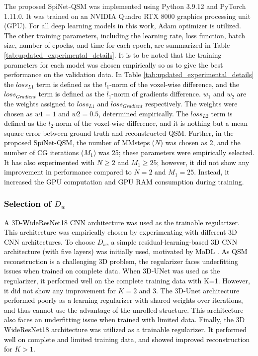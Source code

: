 \documentclass[sn-vancouver,Numbered]{sn-jnl}%
\begin{document}
The proposed SpiNet-QSM was implemented using Python 3.9.12 and PyTorch 1.11.0. It was trained on an NVIDIA Quadro RTX 8000 graphics processing unit (GPU). 
\noindent \textcolor{black} {For all deep learning models in this work, Adam optimizer is utilized. The other training parameters, including the learning rate, loss function, batch size, number of epochs, and time for each epoch, are summarized in Table \ref{tab:updated_experimental_details}. It is to be noted that the training parameters for each model was chosen empirically so as to give the best performance on the validation data. In Table \ref{tab:updated_experimental_details} the $loss_{L1}$ term is defined as the $l_1$-norm of the voxel-wise difference, and the $loss_{Gradient}$ term is defined as the $l_1$-norm of gradients difference. $w_1$ and $w_2$ are the weights assigned to $loss_{L1}$ and $loss_{Gradient}$ respectively. The weights were chosen as $w1=1$ and $w2=0.5$, determined empirically. The $loss_{L2}$ term is defined as the $l_2$-norm of the voxel-wise difference, and it is nothing but a mean square error between ground-truth and reconstructed QSM.} \textcolor{black}{Further, in the proposed SpiNet-QSM, the number of MMsteps ($N$) was chosen as 2, and the number of CG iterations ($M_1$) was 25; these parameters were empirically selected. It has also experimented with $N \ge 2$ and $M_{1} \ge 25$; however, it did not show any improvement in performance compared to $N=2$ and $M_{1}=25$. Instead, it increased the GPU computation and GPU RAM consumption during training. }


\vspace{8pt}
\textcolor{black}{\subsubsection{Selection of $D_w$}}

\noindent \textcolor{black}{A 3D-WideResNet18 CNN architecture was used as the trainable regularizer. This architecture was empirically chosen by experimenting with different 3D CNN architectures. To choose $D_w$, a simple residual-learning-based 3D CNN architecture (with five layers) was initially used, motivated by MoDL \cite{MoDL}. As QSM reconstruction is a challenging 3D problem, the regularizer faces underfitting issues when trained on complete data. When 3D-UNet was used as the regularizer, it performed well on the complete training data with K=1. However, it did not show any improvement for $K=2$ and 3. The 3D-Unet architecture performed poorly as a learning regularizer with shared weights over iterations, and thus cannot use the advantage of the unrolled structure. This architecture also faces an underfitting issue when trained with limited data. Finally, the 3D WideResNet18 architecture was utilized as a trainable regularizer. It performed well on complete and limited training data, and showed improved reconstruction for $K>1$.}
\end{document}
